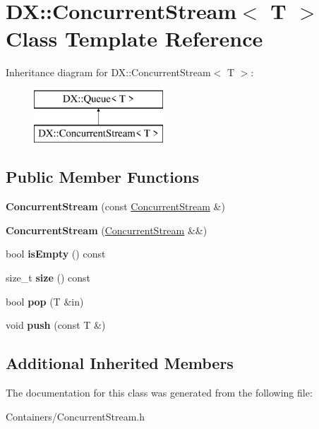\hypertarget{class_d_x_1_1_concurrent_stream}{\section{D\-X\-:\-:Concurrent\-Stream$<$ T $>$ Class Template Reference}
\label{class_d_x_1_1_concurrent_stream}
}
Inheritance diagram for D\-X\-:\-:Concurrent\-Stream$<$ T $>$\-:\begin{figure}[H]
\begin{center}
\leavevmode
\includegraphics[height=2.000000cm]{class_d_x_1_1_concurrent_stream}
\end{center}
\end{figure}
\subsection*{Public Member Functions}
\begin{DoxyCompactItemize}
\item 
\hypertarget{class_d_x_1_1_concurrent_stream_ac6fcc56db716738fe77ddde565339503}{{\bfseries Concurrent\-Stream} (const \hyperlink{class_d_x_1_1_concurrent_stream}{Concurrent\-Stream} \&)}\label{class_d_x_1_1_concurrent_stream_ac6fcc56db716738fe77ddde565339503}

\item 
\hypertarget{class_d_x_1_1_concurrent_stream_aac12bcb6244dd7e4ae9a62aa785d79c9}{{\bfseries Concurrent\-Stream} (\hyperlink{class_d_x_1_1_concurrent_stream}{Concurrent\-Stream} \&\&)}\label{class_d_x_1_1_concurrent_stream_aac12bcb6244dd7e4ae9a62aa785d79c9}

\item 
\hypertarget{class_d_x_1_1_concurrent_stream_a18a671c877a53863cf37761eadb2a207}{bool {\bfseries is\-Empty} () const }\label{class_d_x_1_1_concurrent_stream_a18a671c877a53863cf37761eadb2a207}

\item 
\hypertarget{class_d_x_1_1_concurrent_stream_a33a0054e52290fdb5df8e6d3a7850768}{size\-\_\-t {\bfseries size} () const }\label{class_d_x_1_1_concurrent_stream_a33a0054e52290fdb5df8e6d3a7850768}

\item 
\hypertarget{class_d_x_1_1_concurrent_stream_a9521bf954d75c36f8ebfb6376a2c203d}{bool {\bfseries pop} (T \&in)}\label{class_d_x_1_1_concurrent_stream_a9521bf954d75c36f8ebfb6376a2c203d}

\item 
\hypertarget{class_d_x_1_1_concurrent_stream_ae25718d47d004e3d213556b9d736d5fe}{void {\bfseries push} (const T \&)}\label{class_d_x_1_1_concurrent_stream_ae25718d47d004e3d213556b9d736d5fe}

\end{DoxyCompactItemize}
\subsection*{Additional Inherited Members}


The documentation for this class was generated from the following file\-:\begin{DoxyCompactItemize}
\item 
Containers/Concurrent\-Stream.\-h\end{DoxyCompactItemize}
